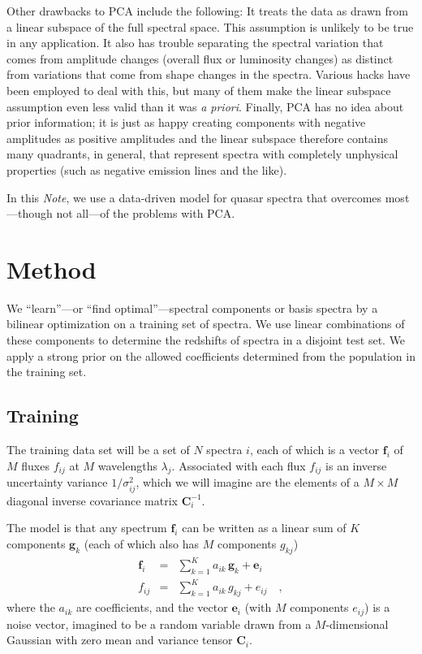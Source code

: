 \documentclass[preprint]{aastex}
\newcommand{\foreign}[1]{\textit{#1}}
\newcommand{\mmatrix}[1]{\boldsymbol{#1}}
\newcommand{\inverse}[1]{{#1}^{-1}}
\newcommand{\covar}{\mmatrix{C}}
\newcommand{\evec}{\mmatrix{e}}
\newcommand{\fvec}{\mmatrix{f}}
\newcommand{\gvec}{\mmatrix{g}}
\newcommand{\invvar}{\inverse{\covar}}
\newcommand{\documentname}{\textsl{Note}}
\begin{document}
Other drawbacks to PCA include the following: It treats the data as
drawn from a linear subspace of the full spectral space.  This
assumption is unlikely to be true in any application.  It also has
trouble separating the spectral variation that comes from amplitude
changes (overall flux or luminosity changes) as distinct from
variations that come from shape changes in the spectra.  Various hacks
have been employed to deal with this, but many of them make the linear
subspace assumption even less valid than it was \foreign{a priori}.
Finally, PCA has no idea about prior information; it is just as happy
creating components with negative amplitudes as positive amplitudes
and the linear subspace therefore contains many quadrants, in general,
that represent spectra with completely unphysical properties (such as
negative emission lines and the like).

In this \documentname, we use a data-driven model for quasar spectra
that overcomes most---though not all---of the problems with PCA.

\section{Method}

We ``learn''---or ``find optimal''---spectral components or basis
spectra by a bilinear optimization on a training set of spectra.  We
use linear combinations of these components to determine the redshifts
of spectra in a disjoint test set.  We apply a strong prior on the
allowed coefficients determined from the population in the training
set.

\subsection{Training}

The training data set will be a set of $N$ spectra $i$, each of which
is a vector $\fvec_i$ of $M$ fluxes $f_{ij}$ at $M$ wavelengths
$\lambda_j$.  Associated with each flux $f_{ij}$ is an inverse
uncertainty variance $1/\sigma^2_{ij}$, which we will imagine are the
elements of a $M\times M$ diagonal inverse covariance matrix
$\invvar_{i}$.

The model is that any spectrum $\fvec_i$ can be written as a linear
sum of $K$ components $\gvec_k$ (each of which also has $M$ components
$g_{kj}$)
\begin{eqnarray}\displaystyle
\fvec_i &=& \sum_{k=1}^K a_{ik}\,\gvec_k + \evec_i \nonumber\\
f_{ij} &=& \sum_{k=1}^K a_{ik}\,g_{kj} + e_{ij}
\quad ,
\end{eqnarray}
where the $a_{ik}$ are coefficients, and the vector $\evec_i$ (with
$M$ components $e_{ij}$) is a noise vector, imagined to be a random
variable drawn from a $M$-dimensional Gaussian with zero mean and
variance tensor $\covar_i$.
\end{document}
